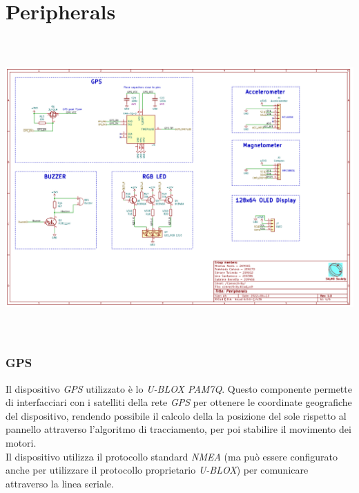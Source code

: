 \hypertarget{peripherals}{%
\section{Peripherals}\label{peripherals}}

\begin{center}
\includegraphics[width=6.5in,height=4.48611in]{figures/image15.png}
\captionsetup{type=figure}
\end{center}

\hypertarget{gps}{%
\subsubsection{\texorpdfstring{\hfill\break
\hfill\break
GPS }{  GPS }}\label{gps}}

Il dispositivo \emph{GPS} utilizzato è lo \emph{U-BLOX PAM7Q}. Questo
componente permette di interfacciari con i satelliti della rete \emph{GPS}
per ottenere le coordinate geografiche del dispositivo, rendendo possibile 
il calcolo della la posizione del sole rispetto al
pannello attraverso l'algoritmo di tracciamento, per poi
stabilire il movimento dei motori.\\
Il dispositivo utilizza il protocollo standard \emph{NMEA} (ma può
essere configurato anche per utilizzare il protocollo proprietario
\emph{U-BLOX}) per comunicare attraverso la linea seriale.

